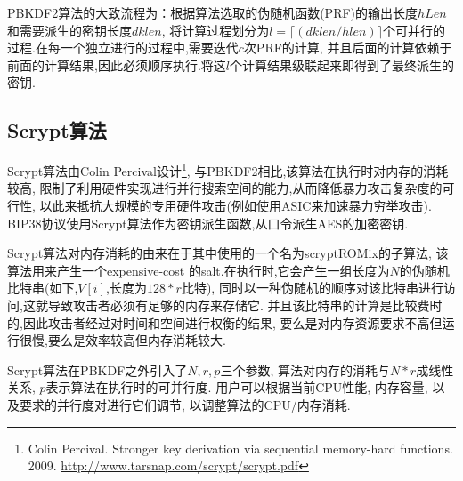PBKDF2算法的大致流程为：根据算法选取的伪随机函数(PRF)的输出长度$hLen$和需要派生的密钥长度$dklen$,
将计算过程划分为$l=\lceil (dklen/hlen) \rceil$个可并行的过程.在每一个独立进行的过程中,需要迭代$c$次PRF的计算,
并且后面的计算依赖于前面的计算结果,因此必须顺序执行.将这$l$个计算结果级联起来即得到了最终派生的密钥.

\subsection{Scrypt算法}
Scrypt算法由Colin Percival设计\footnote{
Colin Percival. Stronger key derivation via sequential memory-hard functions. 2009.
\url{http://www.tarsnap.com/scrypt/scrypt.pdf}},
与PBKDF2相比,该算法在执行时对内存的消耗较高,
限制了利用硬件实现进行并行搜索空间的能力,从而降低暴力攻击复杂度的可行性,
以此来抵抗大规模的专用硬件攻击(例如使用ASIC来加速暴力穷举攻击).
BIP38协议使用Scrypt算法作为密钥派生函数,从口令派生AES的加密密钥. 

Scrypt算法对内存消耗的由来在于其中使用的一个名为\textsf{scryptROMix}的子算法,
该算法用来产生一个expensive-cost 的salt.在执行时,它会产生一组长度为$N$的伪随机比特串(如下,$V[i]$,长度为$128*r$比特),
同时以一种伪随机的顺序对该比特串进行访问,这就导致攻击者必须有足够的内存来存储它.
并且该比特串的计算是比较费时的,因此攻击者经过对时间和空间进行权衡的结果,
要么是对内存资源要求不高但运行很慢,要么是效率较高但内存消耗较大.

Scrypt算法在PBKDF之外引入了$N, r, p$三个参数,
算法对内存的消耗与$N*r$成线性关系, $p$表示算法在执行时的可并行度.
用户可以根据当前CPU性能, 内存容量, 以及要求的并行度对进行它们调节, 以调整算法的CPU/内存消耗.


